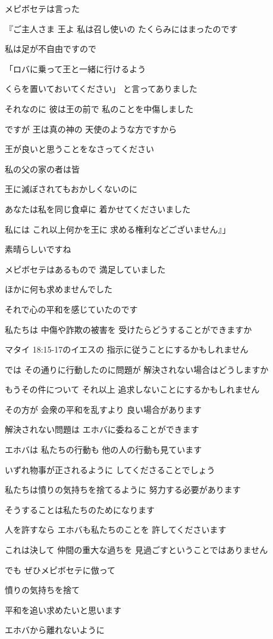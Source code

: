 \documentclass[twocolumn]{jsarticle}
\begin{document}
メピボセテは言った

『ご主人さま 王よ 私は召し使いの
たくらみにはまったのです

私は足が不自由ですので

「ロバに乗って王と一緒に行けるよう

くらを置いておいてください」
と言ってありました

それなのに 彼は王の前で
私のことを中傷しました

ですが 王は真の神の
天使のような方ですから

王が良いと思うことをなさってください

私の父の家の者は皆

王に滅ぼされてもおかしくないのに

あなたは私を同じ食卓に
着かせてくださいました

私には これ以上何かを王に
求める権利などございません』」

素晴らしいですね

メピボセテはあるもので
満足していました

ほかに何も求めませんでした

それで心の平和を感じていたのです

私たちは 中傷や詐欺の被害を
受けたらどうすることができますか

マタイ 18:15-17のイエスの
指示に従うことにするかもしれません

では その通りに行動したのに問題が
解決されない場合はどうしますか

もうその件について それ以上
追求しないことにするかもしれません

その方が 会衆の平和を乱すより
良い場合があります

解決されない問題は
エホバに委ねることができます

エホバは 私たちの行動も
他の人の行動も見ています

いずれ物事が正されるように
してくださることでしょう

私たちは憤りの気持ちを捨てるように
努力する必要があります

そうすることは私たちのためになります

人を許すなら エホバも私たちのことを
許してくださいます

これは決して 仲間の重大な過ちを
見過ごすということではありません

でも ぜひメピボセテに倣って

憤りの気持ちを捨て

平和を追い求めたいと思います

エホバから離れないように
\end{document}
